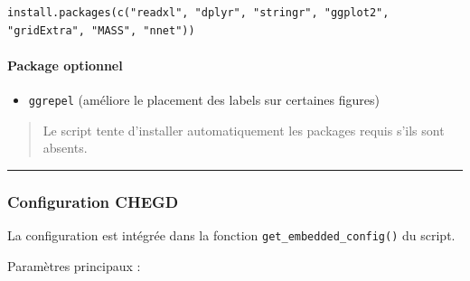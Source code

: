 \begin{verbatim}
install.packages(c("readxl", "dplyr", "stringr", "ggplot2", "gridExtra", "MASS", "nnet"))
\end{verbatim}

\paragraph{Package optionnel}\label{package-optionnel}

\begin{itemize}
\tightlist
\item
  \texttt{ggrepel} (améliore le placement des labels sur certaines
  figures)
\end{itemize}

\begin{quote}
Le script tente d'installer automatiquement les packages requis s'ils
sont absents.
\end{quote}

\begin{center}\rule{0.5\linewidth}{0.5pt}\end{center}

\subsubsection{Configuration CHEGD}\label{configuration-chegd}

La configuration est intégrée dans la fonction
\texttt{get\_embedded\_config()} du script.

Paramètres principaux :

